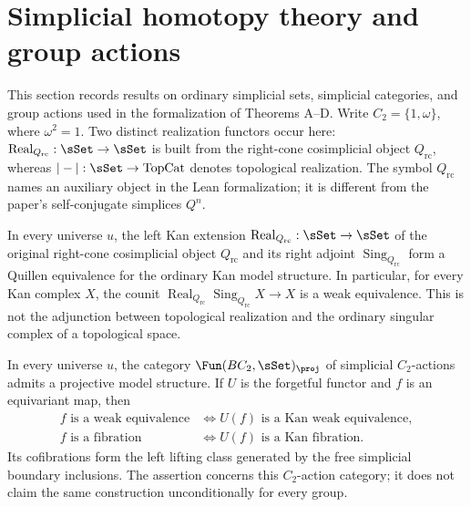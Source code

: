 \section{Simplicial homotopy theory and group actions}

This section records results on ordinary simplicial sets, simplicial categories,
and group actions used in the formalization of Theorems A--D.
Write $C_2=\{1,\omega\}$, where $\omega^2=1$.
Two distinct realization functors occur here:
$\operatorname{Real}_{Q_{\mathrm{rc}}}:\sSet\to\sSet$ is built from the
right-cone cosimplicial object $Q_{\mathrm{rc}}$, whereas
$|-|:\sSet\to\mathrm{TopCat}$ denotes topological realization.
The symbol $Q_{\mathrm{rc}}$ names an auxiliary object in the Lean formalization;
it is different from the paper's self-conjugate simplices $Q^n$.

\begin{resultblock}
\begin{theorem}
In every universe $u$, the left Kan extension
$\operatorname{Real}_{Q_{\mathrm{rc}}}:\sSet\to\sSet$ of the original
right-cone cosimplicial object $Q_{\mathrm{rc}}$ and its right adjoint
$\operatorname{Sing}_{Q_{\mathrm{rc}}}$ form a Quillen equivalence for the
ordinary Kan model structure.
In particular, for every Kan complex $X$, the counit
$\operatorname{Real}_{Q_{\mathrm{rc}}}\operatorname{Sing}_{Q_{\mathrm{rc}}}X\to X$
is a weak equivalence.
This is not the adjunction between topological realization and the ordinary
singular complex of a topological space.
\end{theorem}
\end{resultblock}

\begin{resultblock}
\begin{theorem}
In every universe $u$, the category
$\Fun(BC_2,\sSet)_{\proj}$ of simplicial $C_2$-actions admits a projective
model structure.
If $U$ is the forgetful functor and $f$ is an equivariant map, then
\begin{align}
 f\text{ is a weak equivalence}&\iff U(f)\text{ is a Kan weak equivalence},\\
 f\text{ is a fibration}&\iff U(f)\text{ is a Kan fibration}.
\end{align}
Its cofibrations form the left lifting class generated by the free simplicial
boundary inclusions.
The assertion concerns this $C_2$-action category; it does not claim the same
construction unconditionally for every group.
\end{theorem}
\end{resultblock}


